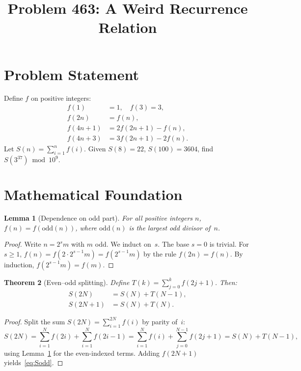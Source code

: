 \documentclass[11pt]{article}
\title{Problem 463: A Weird Recurrence Relation}
\author{}
\date{}
\newtheorem{theorem}{Theorem}
\newtheorem{lemma}[theorem]{Lemma}
\begin{document}
\maketitle

\section{Problem Statement}

Define $f$ on positive integers:
\begin{align*}
f(1) &= 1,\quad f(3) = 3, \\
f(2n) &= f(n), \\
f(4n+1) &= 2f(2n+1) - f(n), \\
f(4n+3) &= 3f(2n+1) - 2f(n).
\end{align*}
Let $S(n) = \sum_{i=1}^{n} f(i)$. Given $S(8) = 22$, $S(100) = 3604$, find $S(3^{37}) \bmod 10^9$.

\section{Mathematical Foundation}

\begin{lemma}[Dependence on odd part]
\label{lem:odd}
For all positive integers $n$, $f(n) = f(\mathrm{odd}(n))$, where $\mathrm{odd}(n)$ is the largest odd divisor of~$n$.
\end{lemma}

\begin{proof}
Write $n = 2^s m$ with $m$ odd. We induct on~$s$. The base $s = 0$ is trivial. For $s \ge 1$, $f(n) = f(2 \cdot 2^{s-1}m) = f(2^{s-1}m)$ by the rule $f(2n) = f(n)$. By induction, $f(2^{s-1}m) = f(m)$.
\end{proof}

\begin{theorem}[Even--odd splitting]
\label{thm:split}
Define $T(k) = \sum_{j=0}^{k} f(2j+1)$. Then:
\begin{align}
S(2N) &= S(N) + T(N-1), \label{eq:Seven} \\
S(2N+1) &= S(N) + T(N). \label{eq:Sodd}
\end{align}
\end{theorem}

\begin{proof}
Split the sum $S(2N) = \sum_{i=1}^{2N} f(i)$ by parity of~$i$:
\[
S(2N) = \sum_{i=1}^{N} f(2i) + \sum_{i=1}^{N} f(2i-1) = \sum_{i=1}^{N} f(i) + \sum_{j=0}^{N-1} f(2j+1) = S(N) + T(N-1),
\]
using Lemma~\ref{lem:odd} for the even-indexed terms. Adding $f(2N+1)$ yields~\eqref{eq:Sodd}.
\end{proof}
\end{document}
